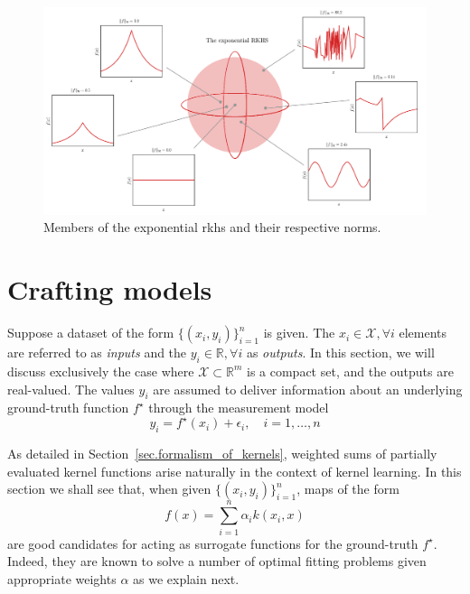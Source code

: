 \begin{landscape}
\begin{figure}
	\includegraphics{../images/chap2_rkhs_ex.pdf} 
	\caption{Members of the exponential \ac{rkhs} and their respective norms.}
	\label{fig.rkhs_ex}
\end{figure}
\end{landscape}


\section{Crafting models}
\label{sec.crafting_models}

Suppose a dataset of the form $\{(x_i,y_i)\}_{i=1}^n$ is given. The $x_i \in \mathcal{X}, \forall i$ elements are referred to as \textit{inputs} and the $y_i \in \mathbb{R}, \forall i$ as \textit{outputs}. In this section, we will discuss exclusively the case where $\mathcal{X} \subset \mathbb{R}^m$ is a compact set, and the outputs are real-valued. The values $y_i$ are assumed to deliver information about an underlying ground-truth function $f^\star$ through the measurement model
\begin{equation}
	y_i = f^\star(x_i) + \epsilon_i, \quad i=1,\dots,n
\end{equation}

As detailed in Section~\ref{sec.formalism_of_kernels}, weighted sums of partially evaluated kernel functions arise naturally in the context of kernel learning. In this section we shall see that, when given $\{(x_i,y_i)\}_{i=1}^n$, maps of the form
\begin{equation}
	f(x) = \sum_{i=1}^n \alpha_i k(x_i,x)
\end{equation}
are good candidates for acting as surrogate functions for the ground-truth $f^\star$. Indeed, they are known to solve a number of optimal fitting problems given appropriate weights $\alpha$ as we explain next.

